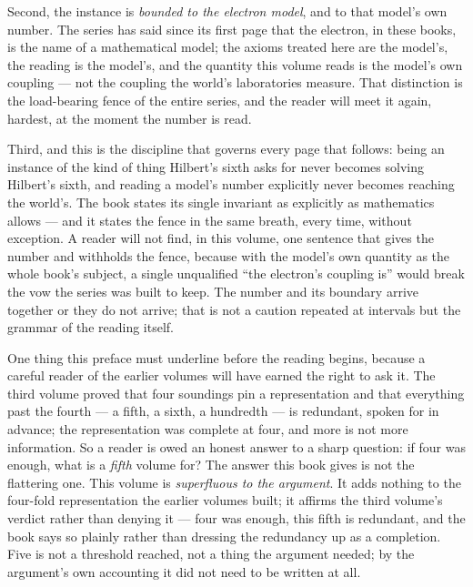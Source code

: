 Second, the instance is \emph{bounded to the electron model}, and to that
model's own number. The series has said since its first page that the
electron, in these books, is the name of a mathematical model; the axioms
treated here are the model's, the reading is the model's, and the quantity
this volume reads is the model's own coupling --- not the coupling the
world's laboratories measure. That distinction is the load-bearing fence
of the entire series, and the reader will meet it again, hardest, at the
moment the number is read.

Third, and this is the discipline that governs every page that follows:
being an instance of the kind of thing Hilbert's sixth asks for never
becomes solving Hilbert's sixth, and reading a model's number explicitly
never becomes reaching the world's. The book states its single invariant
as explicitly as mathematics allows --- and it states the fence in the
same breath, every time, without exception. A reader will not find, in
this volume, one sentence that gives the number and withholds the fence,
because with the model's own quantity as the whole book's subject, a
single unqualified ``the electron's coupling is'' would break the vow the
series was built to keep. The number and its boundary arrive together or
they do not arrive; that is not a caution repeated at intervals but the
grammar of the reading itself.

One thing this preface must underline before the reading begins, because a
careful reader of the earlier volumes will have earned the right to ask it.
The third volume proved that four soundings pin a representation and that
everything past the fourth --- a fifth, a sixth, a hundredth --- is
redundant, spoken for in advance; the representation was complete at four,
and more is not more information. So a reader is owed an honest answer to a
sharp question: if four was enough, what is a \emph{fifth} volume for? The
answer this book gives is not the flattering one. This volume is
\emph{superfluous to the argument}. It adds nothing to the four-fold
representation the earlier volumes built; it affirms the third volume's
verdict rather than denying it --- four was enough, this fifth is redundant,
and the book says so plainly rather than dressing the redundancy up as a
completion. Five is not a threshold reached, not a thing the argument
needed; by the argument's own accounting it did not need to be written at
all.

